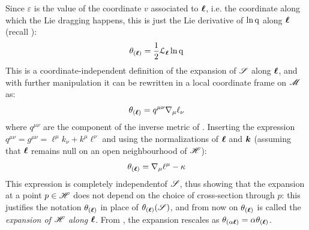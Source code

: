 Since $ \varepsilon $ is the value of the coordinate $ v $ associated to $ \boldsymbol{\ell} $, i.e. the coordinate along which the Lie dragging happens, this is just the Lie derivative of $ \ln \mathrm{q} $ along $ \boldsymbol{\ell} $ (recall ):
\begin{equation}
  \theta_{(\boldsymbol{\ell})} = \frac{1}{2} \EuScript{L}_{\boldsymbol{\ell}} \ln \mathrm{q}
  \label{eq:expansion-lie-der}
\end{equation}
This is a coordinate-independent definition of the expansion of $ \mathscr{S} $ along $ \boldsymbol{\ell} $, and with further manipulation it can be rewritten in a local coordinate frame on $ \mathscr{M} $ as:
\begin{equation}
  \theta_{(\boldsymbol{\ell})} = q^{\mu \nu} \nabla_\mu \ell_\nu
  \label{eq:expansion-comp}
\end{equation}
where $ q^{\mu \nu} $ are the component of the inverse metric of . Inserting the expression $ q^{\mu \nu} = g^{\mu \nu} = \ell^\mu k_\nu + k^\mu \ell^\nu $ and using the normalizations of $ \boldsymbol{\ell} $ and $ \boldsymbol{k} $ (assuming that $ \boldsymbol{\ell} $ remains null on an open neighbourhood of $ \mathscr{H} $):
\begin{equation}
  \theta_{(\boldsymbol{\ell})} = \nabla_\mu \ell^\mu - \kappa
  \label{eq:expansion}
\end{equation}
This expression is completely independent\footnotemark of $ \mathscr{S} $, thus showing that the expansion at a point $ p \in \mathscr{H} $ does not depend on the choice of cross-section through $ p $: this justifies the notation $ \theta_{(\boldsymbol{\ell})} $ in place of $ \theta_{(\boldsymbol{\ell})}(\mathscr{S}) $, and from now on $ \theta_{(\boldsymbol{\ell})} $ is called the \emph{expansion of $ \mathscr{H} $ along $ \boldsymbol{\ell} $}. From , the expansion rescales as $ \theta_{(\alpha \boldsymbol{\ell})} = \alpha \theta_{(\boldsymbol{\ell})} $.



